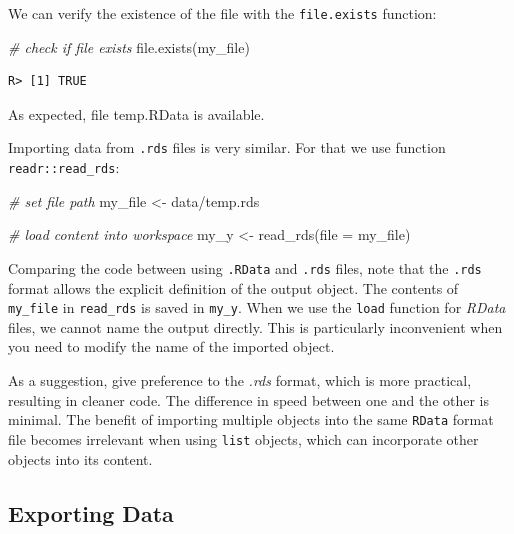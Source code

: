 \documentclass[
  12pt,
]{book}
\newenvironment{Shaded}{\begin{snugshade}}{\end{snugshade}}
\newcommand{\AttributeTok}[1]{\textcolor[rgb]{0.61,0.61,0.61}{#1}}
\newcommand{\CommentTok}[1]{\textcolor[rgb]{0.37,0.37,0.37}{\textit{#1}}}
\newcommand{\FunctionTok}[1]{\textcolor[rgb]{0,0,0}{#1}}
\newcommand{\NormalTok}[1]{#1}
\newcommand{\OtherTok}[1]{\textcolor[rgb]{0.37,0.37,0.37}{#1}}
\newcommand{\StringTok}[1]{\textcolor[rgb]{0.5,0.5,0.5}{#1}}
\newenvironment{rmdimportant}
{\begin{importantblock}
		
	} {\end{importantblock}}
\begin{document}
We can verify the existence of the file with the \texttt{file.exists} function: 

\begin{Shaded}
\begin{Highlighting}[]
\CommentTok{\# check if file exists}
\FunctionTok{file.exists}\NormalTok{(my\_file)}
\end{Highlighting}
\end{Shaded}

\begin{verbatim}
R> [1] TRUE
\end{verbatim}

As expected, file temp.RData is available.

Importing data from \texttt{.rds} files is very similar. For that we use function \texttt{readr::read\_rds}:

\begin{Shaded}
\begin{Highlighting}[]
\CommentTok{\# set file path}
\NormalTok{my\_file }\OtherTok{\textless{}{-}} \StringTok{\textquotesingle{}data/temp.rds\textquotesingle{}}

\CommentTok{\# load content into workspace}
\NormalTok{my\_y }\OtherTok{\textless{}{-}} \FunctionTok{read\_rds}\NormalTok{(}\AttributeTok{file =}\NormalTok{ my\_file)}
\end{Highlighting}
\end{Shaded}

Comparing the code between using \texttt{.RData} and \texttt{.rds} files, note that the \texttt{.rds} format allows the explicit definition of the output object. The contents of \texttt{my\_file} in \texttt{read\_rds} is saved in \texttt{my\_y}. When we use the \texttt{load} function for \emph{RData} files, we cannot name the output directly. This is particularly inconvenient when you need to modify the name of the imported object.

\begin{rmdimportant}
As a suggestion, give preference to the \emph{.rds} format, which is
more practical, resulting in cleaner code. The difference in speed
between one and the other is minimal. The benefit of importing multiple
objects into the same \texttt{RData} format file becomes irrelevant when
using \texttt{list} objects, which can incorporate other objects into
its content.
\end{rmdimportant}

\hypertarget{exporting-data-2}{%
\subsection{Exporting Data}\label{exporting-data-2}}
\end{document}
